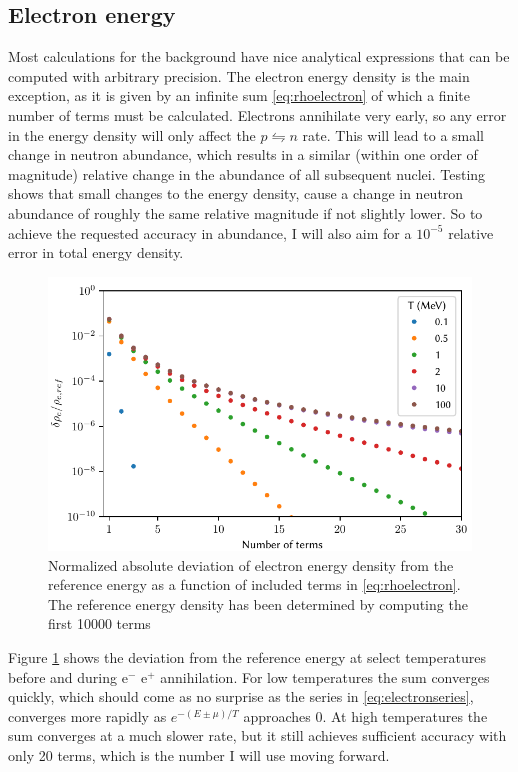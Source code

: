 \subsection{Electron energy}
Most calculations for the background have nice analytical expressions that can be computed with arbitrary precision. The electron energy density is the main exception, as it is given by an infinite sum \eqref{eq:rhoelectron} of which a finite number of terms must be calculated. Electrons annihilate very early, so any error in the energy density will only affect the $p\leftrightharpoons n$ rate. This will lead to a small change in neutron abundance, which results in a similar (within one order of magnitude) relative change in the abundance of all subsequent nuclei. 
Testing shows that small changes to the energy density, cause a change in neutron abundance of roughly the same relative magnitude if not slightly lower. So to achieve the requested accuracy in abundance, I will also aim for a $10^{-5}$ relative error in total energy density. 
\begin{figure}[ht]
    \includegraphics[width=5.1in]{figures/Besselaccuracy.pdf}
    \caption{Normalized absolute deviation of electron energy density from the reference energy as a function of included terms in \eqref{eq:rhoelectron}. The reference energy density has been determined by computing the first 10000 terms}
    \label{fig:Besselaccuracy}
\end{figure}

Figure \ref{fig:Besselaccuracy} shows the deviation from the reference energy at select temperatures before and during e$^-$ e$^+$ annihilation. For low temperatures the sum converges quickly, which should come as no surprise as the series in \eqref{eq:electronseries}, converges more rapidly as $e^{-(E\pm\mu)/T}$ approaches 0. At high temperatures the sum converges at a much slower rate, but it still achieves sufficient accuracy with only 20 terms, which is the number I will use moving forward.


